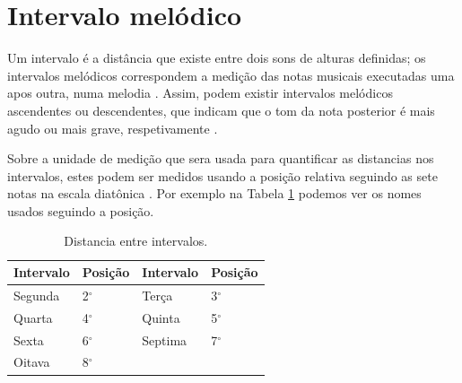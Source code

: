 
\section{Intervalo melódico}
\label{sec:intervalomelodico}


Um intervalo é a distância que existe entre dois sons de alturas definidas;
os intervalos melódicos correspondem a medição das notas musicais executadas uma apos outra, 
numa melodia \cite[pp. 17]{holst1998abc}.
Assim, podem existir intervalos melódicos ascendentes ou descendentes,
que indicam que o tom da nota posterior é mais agudo ou mais grave, respetivamente \cite[pp. 17]{holst1998abc}.

Sobre a unidade de medição que sera usada para quantificar as distancias nos intervalos, 
estes podem ser medidos usando a posição relativa seguindo as sete notas na escala diatônica \cite[pp. 17]{holst1998abc}.
Por exemplo na Tabela \ref{tab:intervalomelodico} podemos ver os nomes usados seguindo a posição.  
\begin{table}[h]
  \centering
  \begin{tabular}{|l|l||l|l|}
  \hline
  Intervalo & Posição     & Intervalo & Posição \\ \hline \hline
  Segunda   & 2$^{\circ}$ & Terça     & 3$^{\circ}$ \\ \hline
  Quarta    & 4$^{\circ}$ & Quinta    & 5$^{\circ}$ \\ \hline
  Sexta     & 6$^{\circ}$ & Septima   & 7$^{\circ}$ \\ \hline
  Oitava    & 8$^{\circ}$ & ~ & ~ \\ \hline
  \end{tabular}
  \caption{Distancia entre intervalos.}
  \label{tab:intervalomelodico}
\end{table}

